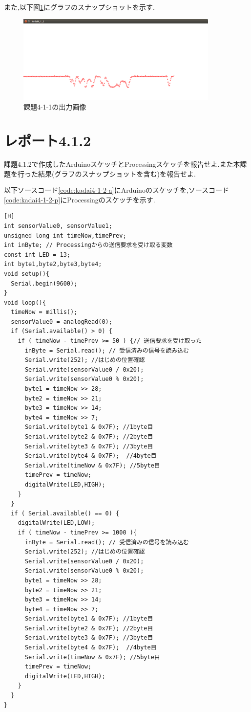 \documentclass{jarticle}
\begin{document}
また,以下図\ref{fig:kadai4-1-1}にグラフのスナップショットを示す.

\begin{figure}[H]
\begin{center}
\includegraphics[width=10.0cm]{images/kadai4-1-1.png}
\caption{課題4-1-1の出力画像}
\label{fig:kadai4-1-1}
\end{center}
\end{figure}


\section{レポート4.1.2}
課題4.1.2で作成したArduinoスケッチとProcessingスケッチを報告せよ.また本課題を行った結果(グラフのスナップショットを含む)を報告せよ.

以下ソースコード\ref{code:kadai4-1-2-a}にArduinoのスケッチを,ソースコード\ref{code:kadai4-1-2-p}にProcessingのスケッチを示す.

\begin{lstlisting}[caption = 課題4.1.2(Arduino),label=code:kadai4-1-2-a][H]
int sensorValue0, sensorValue1;
unsigned long int timeNow,timePrev;
int inByte; // Processingからの送信要求を受け取る変数
const int LED = 13;
int byte1,byte2,byte3,byte4;
void setup(){
  Serial.begin(9600);
}
void loop(){
  timeNow = millis();
  sensorValue0 = analogRead(0);
  if (Serial.available() > 0) {
    if ( timeNow - timePrev >= 50 ) {// 送信要求を受け取った
      inByte = Serial.read(); // 受信済みの信号を読み込む 
      Serial.write(252); //はじめの位置確認
      Serial.write(sensorValue0 / 0x20);
      Serial.write(sensorValue0 % 0x20);
      byte1 = timeNow >> 28;
      byte2 = timeNow >> 21;
      byte3 = timeNow >> 14;
      byte4 = timeNow >> 7;
      Serial.write(byte1 & 0x7F); //1byte目
      Serial.write(byte2 & 0x7F); //2byte目
      Serial.write(byte3 & 0x7F); //3byte目
      Serial.write(byte4 & 0x7F);  //4byte目
      Serial.write(timeNow & 0x7F); //5byte目
      timePrev = timeNow;
      digitalWrite(LED,HIGH);
    }
  }
  if ( Serial.available() == 0) {
    digitalWrite(LED,LOW);
    if ( timeNow - timePrev >= 1000 ){  
      inByte = Serial.read(); // 受信済みの信号を読み込む
      Serial.write(252); //はじめの位置確認
      Serial.write(sensorValue0 / 0x20);
      Serial.write(sensorValue0 % 0x20);
      byte1 = timeNow >> 28;
      byte2 = timeNow >> 21;
      byte3 = timeNow >> 14;
      byte4 = timeNow >> 7;
      Serial.write(byte1 & 0x7F); //1byte目
      Serial.write(byte2 & 0x7F); //2byte目
      Serial.write(byte3 & 0x7F); //3byte目
      Serial.write(byte4 & 0x7F);  //4byte目
      Serial.write(timeNow & 0x7F); //5byte目
      timePrev = timeNow;
      digitalWrite(LED,HIGH);
    }
  }
}
\end{lstlisting}
\end{document}
